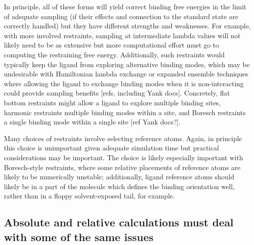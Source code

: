 \documentclass[9pt,bestpractices]{livecoms}
\begin{document}
In principle, all of these forms will yield correct binding free energies in the limit of adequate sampling (if their effects and connection to the standard state are correctly handled) but they have different strengths and weaknesses.
For example, with more involved restraints, sampling at intermediate lambda values will not likely need to be as extensive but more computational effort must go to computing the restraining free energy.
Additionally, such restraints would typically keep the ligand from exploring alternative binding modes, which may be undesirable with Hamiltonian lambda exchange or expanded ensemble techniques where allowing the ligand to exchange binding modes when it is non-interacting could provide sampling benefits [refs, including Yank docs].
Concretely, flat bottom restraints might allow a ligand to explore multiple binding sites, harmonic restraints multiple binding modes within a site, and Boresch restraints a single binding mode within a single site [ref Yank docs?].

Many choices of restraints involve selecting reference atoms.
Again, in principle this choice is unimportant given adequate simulation time but practical considerations may be important.
The choice is likely especially important with Boresch-style restraints, where some relative placements of reference atoms are likely to be numerically unstable; additionally, ligand reference atoms should likely be in a part of the molecule which defines the binding orientation well, rather than in a floppy solvent-exposed tail, for example.





\subsection{Absolute and relative calculations must deal with some of the same issues}
\end{document}

